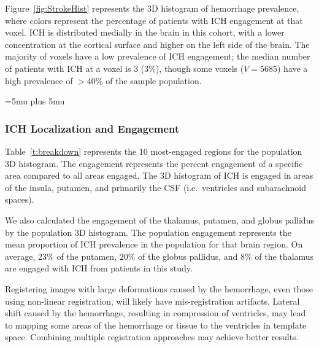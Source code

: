 Figure~\ref{fig:StrokeHist} represents the 3D histogram of hemorrhage prevalence, where colors represent the percentage of patients with ICH engagement at that voxel.  ICH is distributed medially in the brain in this cohort, with a lower concentration at the cortical surface and higher on the left side of the brain.   The majority of voxels have a low prevalence of ICH engagement; the median number of patients with ICH at a voxel is 3 (3\%), though some voxels ($V{=}5685$) have a high prevalence of ${>}40\%$ of the sample population.  


\thickmuskip=5mu plus 5mu



\subsubsection{ICH Localization and Engagement}
Table~\ref{t:breakdown} represents the 10 most-engaged regions for the population 3D histogram.  The engagement represents the percent engagement of a specific area compared to all areas engaged.  The 3D histogram of ICH is engaged in areas of the insula, putamen, and primarily the CSF (i.e.~ventricles and subarachnoid spaces). 

We also calculated the engagement of the thalamus, putamen, and globus pallidus by the population 3D histogram.  The population engagement represents the mean proportion of ICH prevalence in the population for that brain region.  On average, 23\% of the putamen, 20\% of the globus pallidus, and 8\% of the thalamus are engaged with ICH from patients in this study. 

Registering images with large deformations caused by the hemorrhage, even those using non-linear registration, will likely have mis-registration artifacts.  Lateral shift caused by the hemorrhage, resulting in compression of ventricles, may lead to mapping some areas of the hemorrhage or tissue to the ventricles in template space.  Combining multiple registration approaches may achieve better results.



